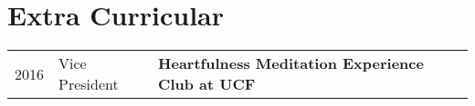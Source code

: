 \documentclass[letterpaper]{kishore-resume} %
\begin{document}
\begin{minipage}[t]{0.66\textwidth}
\section{Extra Curricular} 

\begin{tabular}{rll}
2016         & Vice President & \textbf{Heartfulness Meditation Experience Club at UCF }\\
\end{tabular}







\end{minipage} %








\end{document}
